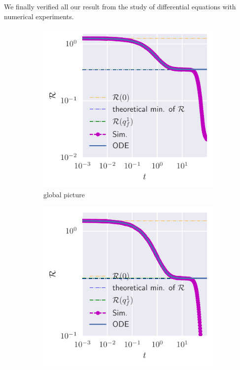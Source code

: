 We finally verified all our result from the study of differential equations with numerical experiments.
\begin{figure}
  \centering
  \begin{subfigure}{0.45\textwidth}
    \includegraphics[width=1.\textwidth]{figures/example-eps0.pdf}
    \caption{global picture}
  \end{subfigure}
  \begin{subfigure}{0.45\textwidth}
    \includegraphics[width=1.\textwidth]{figures/example-eps0-zoomed.pdf}

\end{subfigure}
\end{figure}
